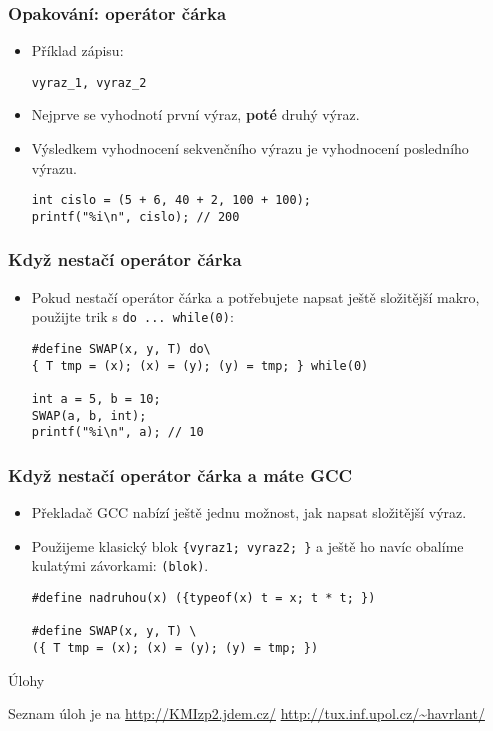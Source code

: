 \documentclass{beamer}
\newenvironment{itemizex}%
  {\large \begin{itemize}%
    \setlength{\itemsep}{8pt}%
    \setlength{\parskip}{8pt}}%
  {\end{itemize}}
\begin{document}
\begin{frame}[t,fragile]\frametitle{Opakování: operátor čárka} 
    \begin{itemizex}
        \item Příklad zápisu:
\begin{verbatim} 
vyraz_1, vyraz_2
\end{verbatim}
        \item Nejprve se vyhodnotí první výraz, \textbf{poté} druhý výraz. 
        \item Výsledkem vyhodnocení sekvenčního výrazu je vyhodnocení posledního výrazu.
\begin{verbatim} 
int cislo = (5 + 6, 40 + 2, 100 + 100);
printf("%i\n", cislo); // 200
\end{verbatim}
    \end{itemizex}
\end{frame}


\begin{frame}[t,fragile]\frametitle{Když nestačí operátor čárka} 
    \begin{itemizex}
        \item Pokud nestačí operátor čárka a potřebujete napsat ještě složitější makro, použijte trik s \texttt{do ... while(0)}:


\begin{verbatim} 
#define SWAP(x, y, T) do\
{ T tmp = (x); (x) = (y); (y) = tmp; } while(0)

int a = 5, b = 10;
SWAP(a, b, int);
printf("%i\n", a); // 10
\end{verbatim}
    \end{itemizex}
\end{frame}


\begin{frame}[t,fragile]\frametitle{Když nestačí operátor čárka a máte GCC} 
    \begin{itemizex}
        \item Překladač GCC nabízí ještě jednu možnost, jak napsat složitější výraz.
        \item Použijeme klasický blok \texttt{\{vyraz1; vyraz2; \}} a ještě ho navíc obalíme kulatými závorkami: \texttt{(blok)}.
        \begin{verbatim} 
#define nadruhou(x) ({typeof(x) t = x; t * t; })

#define SWAP(x, y, T) \
({ T tmp = (x); (x) = (y); (y) = tmp; })
        \end{verbatim}
    \end{itemizex}
\end{frame}


\begin{frame}[t,fragile]{Úlohy}
\begin{center}
\vskip 1cm
{\Large Seznam úloh je na \url{http://KMIzp2.jdem.cz/}}
\vskip 2cm
\url{http://tux.inf.upol.cz/~havrlant/}
\end{center}
\end{frame}
\end{document}
